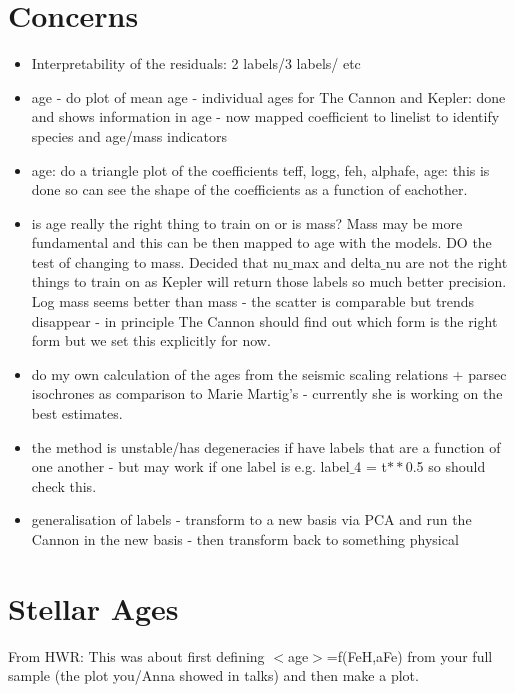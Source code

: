 \documentclass[11pt]{amsart}
\begin{document}
\section{Concerns}
\begin{itemize}
\item Interpretability of the residuals: 2 labels/3 labels/ etc
\item age - do plot of mean age - individual ages for The Cannon and Kepler: done and shows information in age - now mapped coefficient to linelist to identify species and age/mass indicators \\
\item age: do a triangle plot of the coefficients teff, logg, feh, alphafe, age: this is done so can see the shape of the coefficients as a function of eachother. \\ 
\item is age really the right thing to train on or is mass? Mass may be more fundamental and this can be then mapped to age with the models. DO the test of changing to mass. Decided that nu$\_$max and delta$\_$nu are not the right things to train on as Kepler will return those labels so much better precision. Log mass seems better than mass - the scatter is comparable but trends disappear - in principle The Cannon should find out which form is the right form but we set this explicitly for now. 
\item  do my own calculation of the ages from the seismic scaling relations + parsec isochrones as comparison to Marie Martig's - currently she is working on the best estimates. 
\item the method is unstable/has degeneracies if have labels that are a function of one another - but may work if one label is e.g. label$\_$4 = t$**$0.5 so should check this. 
\item generalisation of labels - transform to a new basis via PCA and run the Cannon in the new basis - then transform back to something physical 
\end{itemize} 

\section{Stellar Ages}

 From HWR: This was about first defining $<$age$>$=f(FeH,aFe) from your full
 sample (the plot you/Anna showed in talks) and
 then make a plot. 
 
\end{document}

